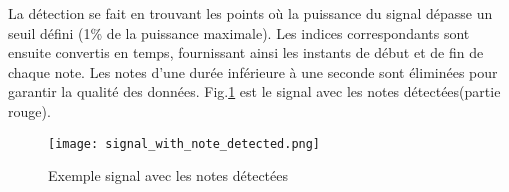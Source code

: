 La détection se fait en trouvant les points où la puissance du signal dépasse un seuil défini (1\% de la puissance maximale). Les indices correspondants sont ensuite convertis en temps, fournissant ainsi les instants de début et de fin de chaque note. Les notes d'une durée inférieure à une seconde sont éliminées pour garantir la qualité des données. 
Fig.\ref{fig:Note_Detection} est le signal avec les notes détectées(partie rouge).
\begin{figure}[htb]
    \centering
    \texttt{[image: signal\_with\_note\_detected.png]}
    \caption{Exemple signal avec les notes détectées}
    \label{fig:Note_Detection}
\end{figure}